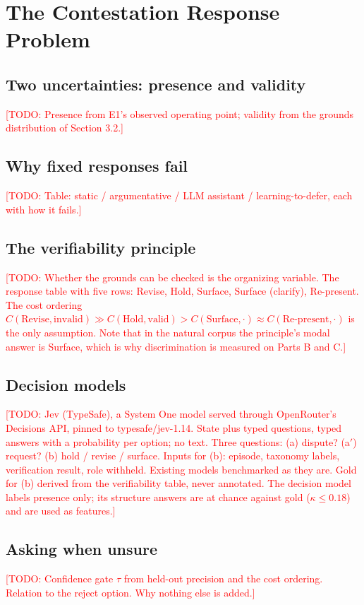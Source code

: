 \documentclass[preprint,12pt,3p,times]{elsarticle}
\newcommand{\todo}[1]{\textcolor{red}{[TODO: #1]}}
\begin{document}
\section{The Contestation Response Problem}  %
\subsection{Two uncertainties: presence and validity}
\todo{Presence from E1's observed operating point; validity from the grounds distribution of Section 3.2.}
\subsection{Why fixed responses fail}
\todo{Table: static / argumentative / LLM assistant / learning-to-defer, each with how it fails.}
\subsection{The verifiability principle}
\todo{Whether the grounds can be checked is the organizing variable. The response table with five rows: Revise, Hold, Surface, Surface (clarify), Re-present. The cost ordering $C(\mathrm{Revise},\mathrm{invalid}) \gg C(\mathrm{Hold},\mathrm{valid}) > C(\mathrm{Surface},\cdot) \approx C(\mathrm{Re\mbox{-}present},\cdot)$ is the only assumption. Note that in the natural corpus the principle's modal answer is Surface, which is why discrimination is measured on Parts B and C.}
\subsection{Decision models}
\todo{Jev (TypeSafe), a System One model served through OpenRouter's Decisions API, pinned to typesafe/jev-1.14. State plus typed questions, typed answers with a probability per option; no text. Three questions: (a) dispute? (a$'$) request? (b) hold / revise / surface. Inputs for (b): episode, taxonomy labels, verification result, role withheld. Existing models benchmarked as they are. Gold for (b) derived from the verifiability table, never annotated. The decision model labels presence only; its structure answers are at chance against gold ($\kappa \le 0.18$) and are used as features.}
\subsection{Asking when unsure}
\todo{Confidence gate $\tau$ from held-out precision and the cost ordering. Relation to the reject option. Why nothing else is added.}
\end{document}
